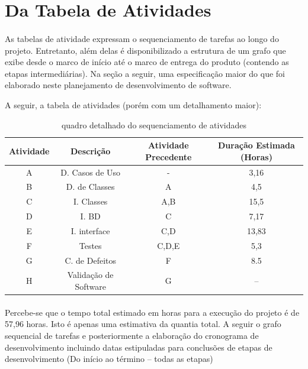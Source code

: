 \documentclass[12pt,a4paper]{article}
\begin{document}
 		\section{Da Tabela de Atividades}
		\paragraph{} As tabelas de atividade expressam o sequenciamento de tarefas ao longo do projeto. Entretanto, além delas é disponibilizado a estrutura de um grafo que exibe desde o marco de início até o marco de entrega do produto (contendo as etapas intermediárias). Na seção a seguir, uma especificação maior do que foi elaborado neste planejamento de desenvolvimento de software.
		
		
		A seguir, a tabela de atividades (porém com um detalhamento maior): 
		
		
		\begin{table}[!ht]
				\centering
				\begin{tabular}{|c|c|c|c|}
					\hline 
					Atividade & Descrição& Atividade Precedente & Duração Estimada (Horas) \\ 
					\hline 
					A & D. Casos de Uso & - & 3,16 \\ 
					\hline 
					B & D. de Classes& A & 4,5 \\         
					\hline 
					C & I. Classes& A,B & 15,5 \\ 
					\hline 
					D & I. BD& C & 7,17 \\ 
					\hline 
					E & I. interface & C,D & 13,83 \\ 
					\hline 	
					F & Testes & C,D,E &  5,3 \\
					\hline
					G & C. de Defeitos & F & 8.5 \\
					\hline 
					H & Validação de Software & G & -- \\ \hline 
					
				\end{tabular}	
				\caption{quadro detalhado do sequenciamento de atividades}
		\end{table}
		\paragraph{} Percebe-se que o tempo total estimado em horas para a execução do projeto é de 57,96 horas. Isto é apenas uma estimativa da quantia total. A seguir o grafo sequencial de tarefas e posteriormente a elaboração do cronograma de desenvolvimento incluindo datas estipuladas para conclusões de etapas de desenvolvimento (Do início ao término -- todas as etapas)
		
\end{document}
